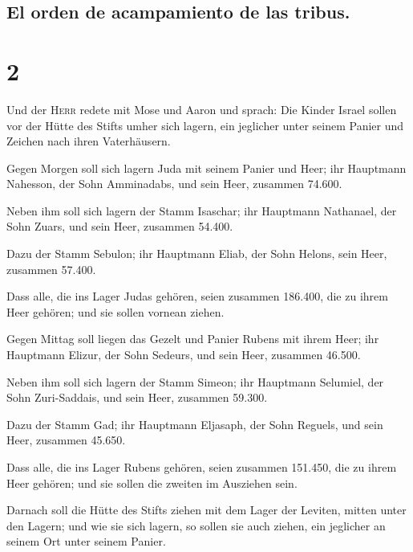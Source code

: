 \hypertarget{el-orden-de-acampamiento-de-las-tribus.}{%
\subsection{El orden de acampamiento de las
tribus.}\label{el-orden-de-acampamiento-de-las-tribus.}}

\hypertarget{section-1}{%
\section{2}\label{section-1}}

 Und der \textsc{Herr} redete mit Mose und Aaron und
sprach:  Die Kinder Israel sollen vor der Hütte des Stifts
umher sich lagern, ein jeglicher unter seinem Panier und Zeichen nach
ihren Vaterhäusern.

 Gegen Morgen soll sich lagern Juda mit seinem Panier und
Heer; ihr Hauptmann Nahesson, der Sohn Amminadabs,  und
sein Heer, zusammen 74.600.

 Neben ihm soll sich lagern der Stamm Isaschar; ihr
Hauptmann Nathanael, der Sohn Zuars,  und sein Heer,
zusammen 54.400.

 Dazu der Stamm Sebulon; ihr Hauptmann Eliab, der Sohn
Helons,  sein Heer, zusammen 57.400.

 Dass alle, die ins Lager Judas gehören, seien zusammen
186.400, die zu ihrem Heer gehören; und sie sollen vornean ziehen.

 Gegen Mittag soll liegen das Gezelt und Panier Rubens
mit ihrem Heer; ihr Hauptmann Elizur, der Sohn Sedeurs, 
und sein Heer, zusammen 46.500.

 Neben ihm soll sich lagern der Stamm Simeon; ihr
Hauptmann Selumiel, der Sohn Zuri-Saddais,  und sein
Heer, zusammen 59.300.

 Dazu der Stamm Gad; ihr Hauptmann Eljasaph, der Sohn
Reguels,  und sein Heer, zusammen 45.650.

 Dass alle, die ins Lager Rubens gehören, seien zusammen
151.450, die zu ihrem Heer gehören; und sie sollen die zweiten im
Ausziehen sein.

 Darnach soll die Hütte des Stifts ziehen mit dem Lager
der Leviten, mitten unter den Lagern; und wie sie sich lagern, so sollen
sie auch ziehen, ein jeglicher an seinem Ort unter seinem Panier.

